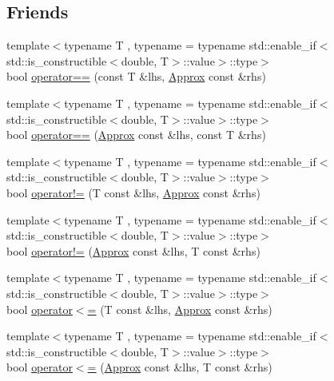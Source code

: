 \subsection*{Friends}
\begin{DoxyCompactItemize}
\item 
{\footnotesize template$<$typename T , typename  = typename std\+::enable\+\_\+if$<$std\+::is\+\_\+constructible$<$double, T$>$\+::value$>$\+::type$>$ }\\bool \mbox{\hyperlink{class_catch_1_1_detail_1_1_approx_ab38782a37d09b527ca5e126dbf433dda}{operator==}} (const T \&lhs, \mbox{\hyperlink{class_catch_1_1_detail_1_1_approx}{Approx}} const \&rhs)
\item 
{\footnotesize template$<$typename T , typename  = typename std\+::enable\+\_\+if$<$std\+::is\+\_\+constructible$<$double, T$>$\+::value$>$\+::type$>$ }\\bool \mbox{\hyperlink{class_catch_1_1_detail_1_1_approx_a0e5ef1957d4c38d7857005909c613743}{operator==}} (\mbox{\hyperlink{class_catch_1_1_detail_1_1_approx}{Approx}} const \&lhs, const T \&rhs)
\item 
{\footnotesize template$<$typename T , typename  = typename std\+::enable\+\_\+if$<$std\+::is\+\_\+constructible$<$double, T$>$\+::value$>$\+::type$>$ }\\bool \mbox{\hyperlink{class_catch_1_1_detail_1_1_approx_a29696f14ebd51887c8c88e771d12ef54}{operator!=}} (T const \&lhs, \mbox{\hyperlink{class_catch_1_1_detail_1_1_approx}{Approx}} const \&rhs)
\item 
{\footnotesize template$<$typename T , typename  = typename std\+::enable\+\_\+if$<$std\+::is\+\_\+constructible$<$double, T$>$\+::value$>$\+::type$>$ }\\bool \mbox{\hyperlink{class_catch_1_1_detail_1_1_approx_a31d62e3c35abb86cf25e02601966ca5d}{operator!=}} (\mbox{\hyperlink{class_catch_1_1_detail_1_1_approx}{Approx}} const \&lhs, T const \&rhs)
\item 
{\footnotesize template$<$typename T , typename  = typename std\+::enable\+\_\+if$<$std\+::is\+\_\+constructible$<$double, T$>$\+::value$>$\+::type$>$ }\\bool \mbox{\hyperlink{class_catch_1_1_detail_1_1_approx_a0369de03e81bc2ceaf6c9d830476bd49}{operator$<$=}} (T const \&lhs, \mbox{\hyperlink{class_catch_1_1_detail_1_1_approx}{Approx}} const \&rhs)
\item 
{\footnotesize template$<$typename T , typename  = typename std\+::enable\+\_\+if$<$std\+::is\+\_\+constructible$<$double, T$>$\+::value$>$\+::type$>$ }\\bool \mbox{\hyperlink{class_catch_1_1_detail_1_1_approx_a6040b908588745570847d7ae8483b091}{operator$<$=}} (\mbox{\hyperlink{class_catch_1_1_detail_1_1_approx}{Approx}} const \&lhs, T const \&rhs)

\end{DoxyCompactItemize}
